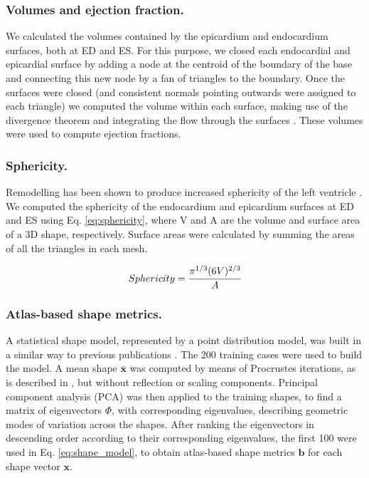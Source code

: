 \documentclass{llncs}
\begin{document}
	\subsubsection{Volumes and ejection fraction.}
We calculated the volumes contained by the epicardium and endocardium surfaces, both at ED and ES. For this purpose, we closed each endocardial and epicardial surface by adding a node at the centroid of the boundary of the base and connecting this new node by a fan of triangles to the boundary. Once the surfaces were closed (and consistent normals pointing outwards were assigned to each triangle) we computed the volume within each surface, making use of the divergence theorem and integrating the flow through the surfaces \cite{Millan2007}. These volumes were used to compute ejection fractions. 
\subsubsection{Sphericity.}Remodelling has been shown to produce increased sphericity of the left ventricle \cite{Sutton2000}. We  computed the sphericity \cite{Wadell1933} of the endocardium and epicardium surfaces at ED and ES using Eq. \ref{eq:sphericity}, where V and A are the volume and surface area of a 3D shape, respectively. Surface areas were calculated by summing the areas of all the triangles in each mesh.

\begin{equation} \label{eq:sphericity}
 Sphericity = \cfrac{\pi^{1/3}(6V)^{2/3}}{A} 
\end{equation}

\subsubsection{Atlas-based shape metrics.} 

A statistical shape model, represented by a point distribution model, was built in a similar way to previous publications \cite{VanAssen2006,Lotjonen2004}. The 200 training cases were used to build the model. A mean shape $\mathbf{\bar{x}}$ was computed by means of Procrustes iterations, as is described in \cite{Gower1975}, but without reflection or scaling components. Principal component analysis (PCA) was then applied to the training shapes, to find a matrix of eigenvectors $\Phi$, with corresponding eigenvalues, describing geometric modes of variation across the shapes. 
After ranking the eigenvectors in descending order according to their corresponding eigenvalues, the first 100 were used in Eq. \ref{eq:shape_model}, to obtain atlas-based shape metrics $\textbf{b} $ for each shape vector $ \textbf{x} $. 
\end{document}
